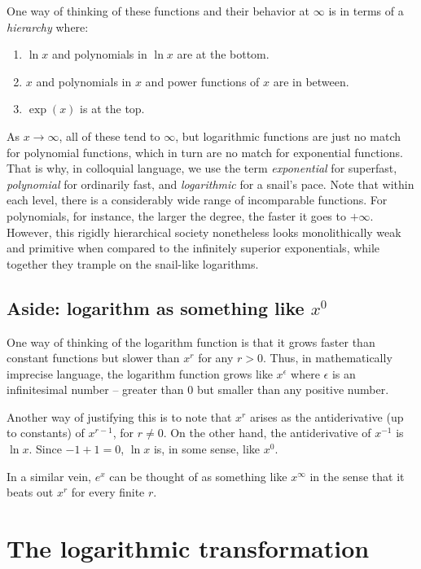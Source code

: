 \documentclass[10pt]{amsart}
\begin{document}
One way of thinking of these functions and their behavior
at $\infty$ is in terms of a {\em hierarchy} where:

\begin{enumerate}
\item $\ln x$ and polynomials in $\ln x$ are at the bottom.
\item $x$ and polynomials in $x$ and power functions of $x$ are in between.
\item $\exp(x)$ is at the top.
\end{enumerate}

As $x \to \infty$, all of these tend to $\infty$, but logarithmic
functions are just no match for polynomial functions, which in turn
are no match for exponential functions. That is why, in colloquial
language, we use the term {\em exponential} for superfast, {\em
polynomial} for ordinarily fast, and {\em logarithmic} for a snail's
pace. Note that within each level, there is a considerably wide range
of incomparable functions. For polynomials, for instance, the larger
the degree, the faster it goes to $+\infty$. However, this rigidly
hierarchical society nonetheless looks monolithically weak and
primitive when compared to the infinitely superior exponentials, while
together they trample on the snail-like logarithms.

\subsection*{Aside: logarithm as something like $x^0$}

One way of thinking of the logarithm function is that it grows faster
than constant functions but slower than $x^r$ for any $r > 0$. Thus,
in mathematically imprecise language, the logarithm function grows like
$x^\epsilon$ where $\epsilon$ is an infinitesimal number -- greater
than $0$ but smaller than any positive number.

Another way of justifying this is to note that $x^r$ arises as the
antiderivative (up to constants) of $x^{r- 1}$, for $r \ne 0$. On the
other hand, the antiderivative of $x^{-1}$ is $\ln x$. Since $-1 + 1 =
0$, $\ln x$ is, in some sense, like $x^0$.

In a similar vein, $e^x$ can be thought of as something like
$x^\infty$ in the sense that it beats out $x^r$ for every finite $r$.

\section{The logarithmic transformation}
\end{document}
